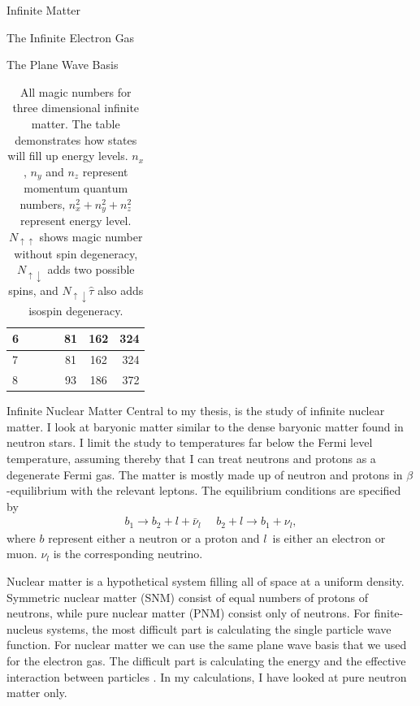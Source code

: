 \documentclass[twoside,english]{uiofysmaster}
\begin{document}
\begin{chapter}{Infinite Matter}
\begin{section}{The Infinite Electron Gas}
\begin{subsection}{The Plane Wave Basis}
\begin{table}[H]
\begin{center}
\begin{tabular}[center]{l | c c c | c | c | r }
						\hline
						6 &   &   &   & 81&162&324\\
						\hline
						7 &   &   &   & 81&162&324\\
						\hline
						8 &   &   &   & 93&186&372
					\end{tabular}
				\end{center}
				\caption{All magic numbers for three dimensional infinite matter. The table demonstrates how states will fill up energy levels. $n_x$, $n_y$ and $n_z$ represent momentum quantum numbers, $n_x^2 + n_y^2 + n_z^2$ represent energy level. $N_{\uparrow \uparrow}$ shows magic number without spin degeneracy, $N_{\uparrow \downarrow}$ adds two possible spins, and $N_{\uparrow \downarrow} \hat \tau $ also adds isospin degeneracy.} 
				\label{Magic Numbers 3d}
			\end{table}

		\end{subsection}

	\end{section}

	\begin{section}{Infinite Nuclear Matter}
		Central to my thesis, is the study of infinite nuclear
                matter. I look at baryonic matter similar to the dense
                baryonic matter found in neutron stars. I limit the
                study to temperatures far below the Fermi level
                temperature, assuming thereby that I can treat
                neutrons and protons as a degenerate Fermi gas. The
                matter is mostly made up of neutron and protons in
                $\beta$-equilibrium with the relevant leptons. 
                The
                equilibrium conditions are specified by
		\begin{align}
		 	b_1 \rightarrow b_2 + l + \bar \nu_l \:\:\:\:\:\: b_2 + l \rightarrow b_1 + \nu_l,
		\end{align} 
		where $b$ represent either a neutron or a proton and $l$ is either an electron or muon. $\nu_l$ is the corresponding neutrino. 

		Nuclear matter is a hypothetical system filling all of
                space at a uniform density. Symmetric nuclear matter
                (SNM) consist of equal numbers of protons of neutrons,
                while pure nuclear matter (PNM) consist only of
                neutrons. For finite-nucleus systems, the most
                difficult part is calculating the single particle wave
                function. For nuclear matter we can use the same plane
                wave basis that we used for the electron gas. The
                difficult part is calculating the energy and the
                effective interaction between particles
                \cite{Day1967}. In my calculations, I have looked at
                pure neutron  matter only.
	\end{section}


\end{chapter}
\end{document}
